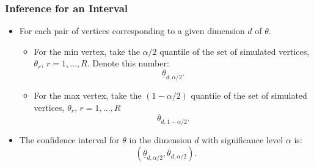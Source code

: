 \documentclass[10pt,letterpaper]{beamer}
\begin{document}
\begin{frame}
\frametitle{Inference for an Interval}

\begin{itemize}
\item For each pair of vertices corresponding to a given dimension $d$ of $%
\theta$. 

\begin{itemize}
\item For the min vertex, take the $\alpha/2$ quantile of the set of
simulated vertices, $\theta_{r}$, $r=1,\dots,R$. Denote this number:  
\begin{equation*}
\underline{\theta}_{d,\alpha/2}.
\end{equation*}

\item For the max vertex, take the $(1-\alpha/2)$ quantile of the set of
simulated vertices, $\theta_{r}$, $r=1,\dots,R$  
\begin{equation*}
\overline{\theta}_{d,1-\alpha/2}.
\end{equation*}
\end{itemize}

\item The confidence interval for $\theta$ in the dimension $d$ with
significance level $\alpha$ is:  
\begin{equation*}
(\underline{\theta}_{d,\alpha/2},\overline{\theta}_{d,\alpha/2}).
\end{equation*}
\end{itemize}
\end{frame}

\end{document}
